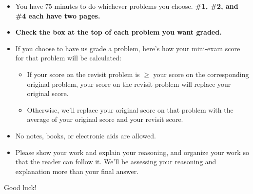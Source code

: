 \bigskip

\begin{itemize}
\item You have 75 minutes to do whichever problems you choose. \textbf{\#1, \#2, and \#4 each have two pages.}

\item \textbf{Check the box  at
      the top of each problem you want graded.}

\item If you choose to have us grade a problem, here's how your
  mini-exam score for that problem will be calculated:
  \begin{itemize}
  \item If your score on the revisit problem is $\geq$ your score on
    the corresponding original problem, your score on the revisit
    problem will replace your original score.
  \item Otherwise, we'll replace your original score on that problem
    with the average of your original score and your revisit score.
  \end{itemize}
  
\item No notes, books, or electronic aids are allowed.
  
\item Please show your work and explain your reasoning, and organize
  your work so that the reader can follow it. We'll be assessing your
  reasoning and explanation more than your final answer.

\end{itemize}

\large Good luck!

\smallskip
